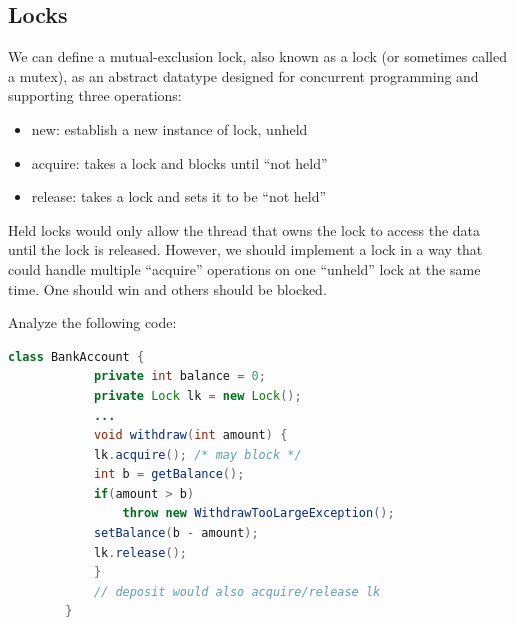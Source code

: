 \documentclass[letterpaper,12pt]{article}
\begin{document}
\subsection{Locks}
We can define a mutual-exclusion lock, also known as a lock (or sometimes called a mutex), as an abstract datatype designed for concurrent programming and supporting three operations:
\begin{itemize}
      \item new: establish a new instance of lock, unheld
      \item acquire: takes a lock and blocks until ``not held''
      \item release: takes a lock and sets it to be ``not held''
\end{itemize}
Held locks would only allow the thread that owns the lock to access the data until the lock is released. However, we should implement a lock in a way that could handle multiple ``acquire'' operations on one ``unheld'' lock at the same time. One should win and others should be blocked. 

Analyze the following code:
\begin{lstlisting}[language=Java]
      class BankAccount {
            private int balance = 0;
            private Lock lk = new Lock();
            ...
            void withdraw(int amount) {
            lk.acquire(); /* may block */
            int b = getBalance();
            if(amount > b)
                throw new WithdrawTooLargeException();
            setBalance(b - amount);
            lk.release();
            }
            // deposit would also acquire/release lk
        }  
\end{lstlisting}
\end{document}
